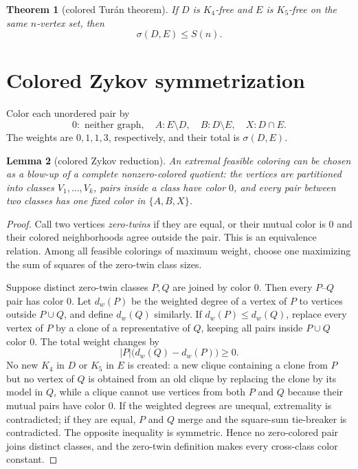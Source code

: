 \documentclass[11pt]{article}
\theoremstyle{plain}
\newtheorem{theorem}{Theorem}[section]
\newtheorem{lemma}[theorem]{Lemma}
\theoremstyle{definition}
\theoremstyle{remark}
\newcommand{\1}{\mathbf 1}
\begin{document}
\begin{theorem}[colored Tur\'an theorem]\label{thm:colored}
If $D$ is $K_4$-free and $E$ is $K_5$-free on the same $n$-vertex set, then
\begin{equation}\label{eq:colored}
 \sigma(D,E)\leq S(n).
\end{equation}
\end{theorem}

\section{Colored Zykov symmetrization}\label{sec:zykov}

Color each unordered pair by
\[
 0:\text{ neither graph},\quad
 A:E\setminus D,\quad
 B:D\setminus E,\quad
 X:D\cap E.
\]
The weights are $0,1,1,3$, respectively, and their total is $\sigma(D,E)$.

\begin{lemma}[colored Zykov reduction]\label{lem:zykov}
An extremal feasible coloring can be chosen as a blow-up of a complete
nonzero-colored quotient: the vertices are partitioned into classes
$V_1,\ldots,V_k$, pairs inside a class have color $0$, and every pair between
two classes has one fixed color in $\{A,B,X\}$.
\end{lemma}

\begin{proof}
Call two vertices \emph{zero-twins} if they are equal, or their mutual color
is $0$ and their colored neighborhoods agree outside the pair.  This is an
equivalence relation.  Among all feasible colorings of maximum weight, choose
one maximizing the sum of squares of the zero-twin class sizes.

Suppose distinct zero-twin classes $P,Q$ are joined by color $0$.  Then every
$P$--$Q$ pair has color $0$.  Let $d_w(P)$ be the weighted degree of a vertex
of $P$ to vertices outside $P\cup Q$, and define $d_w(Q)$ similarly.  If
$d_w(P)\leq d_w(Q)$, replace every vertex of $P$ by a clone of a representative
of $Q$, keeping all pairs inside $P\cup Q$ color $0$.  The total weight changes
by
\[
 |P|\bigl(d_w(Q)-d_w(P)\bigr)\geq0.
\]
No new $K_4$ in $D$ or $K_5$ in $E$ is created: a new clique containing a
clone from $P$ but no vertex of $Q$ is obtained from an old clique by replacing
the clone by its model in $Q$, while a clique cannot use vertices from both
$P$ and $Q$ because their mutual pairs have color $0$.  If the weighted
degrees are unequal, extremality is contradicted; if they are equal, $P$ and
$Q$ merge and the square-sum tie-breaker is contradicted.  The opposite
inequality is symmetric.  Hence no zero-colored pair joins distinct classes,
and the zero-twin definition makes every cross-class color constant.
\end{proof}
\end{document}
